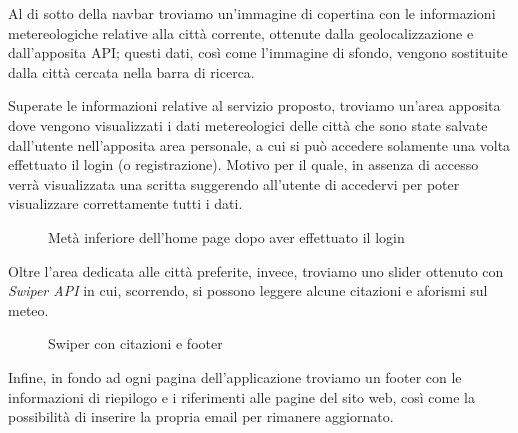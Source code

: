 \vspace{5mm}

Al di sotto della navbar troviamo un'immagine di copertina con le informazioni metereologiche relative alla città corrente, ottenute dalla geolocalizzazione e dall'apposita API;
questi dati, così come l'immagine di sfondo, vengono sostituite dalla città cercata nella barra di ricerca.

\vspace{5mm}

Superate le informazioni relative al servizio proposto, troviamo un'area apposita dove vengono visualizzati i dati metereologici delle città che sono state
salvate dall'utente nell'apposita area personale, a cui si può accedere solamente una volta effettuato il login (o registrazione). Motivo per il quale, in assenza di accesso verrà visualizzata una scritta
suggerendo all'utente di accedervi per poter visualizzare correttamente tutti i dati.

\begin{figure}[ht]
    \centering
    \caption{Metà inferiore dell'home page dopo aver effettuato il login}
\end{figure}

Oltre l'area dedicata alle città preferite, invece, troviamo uno slider ottenuto con \emph{Swiper API} in cui, scorrendo, si possono leggere alcune citazioni e aforismi sul meteo.

\begin{figure}[ht]
    \centering
    \caption{Swiper con citazioni e footer}
\end{figure}

\vspace{5mm}

Infine, in fondo ad ogni pagina dell'applicazione troviamo un footer con le informazioni di riepilogo e i riferimenti alle pagine del sito web, così come la possibilità di inserire la propria email per
rimanere aggiornato.

